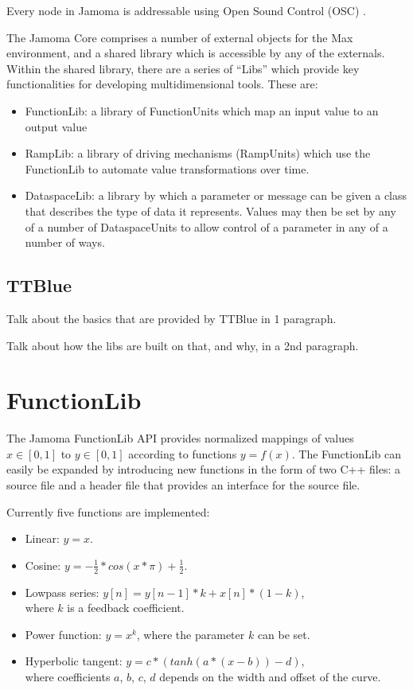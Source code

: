 \documentclass{article}
\begin{document}
Every node in Jamoma is addressable using Open Sound Control (OSC) \cite{Wright:1997}\cite{Wright:2003}. 

The Jamoma Core comprises a number of external objects for the Max \cite{?} environment, and a shared library which is accessible by any of the externals.  Within the shared library, there are a series of ``Libs'' which provide key functionalities for developing multidimensional tools.  These are:
\begin{itemize}
	\item FunctionLib: a library of FunctionUnits which map an input value to an output value
	\item RampLib: a library of driving mechanisms (RampUnits) which use the FunctionLib to automate value transformations over time.
	\item DataspaceLib: a library by which a parameter or message can be given a class that describes the type of data it represents.  Values may then be set by any of a number of DataspaceUnits to allow control of a parameter in any of a number of ways.
\end{itemize}



\subsection{TTBlue}

Talk about the basics that are provided by TTBlue in 1 paragraph.

Talk about how the libs are built on that, and why, in a 2nd paragraph.




\section{FunctionLib}\label{sec:functionlib}

The Jamoma FunctionLib API provides normalized mappings of values $x \in [0,1]$ to $y \in [0,1]$ according to functions $y = f(x)$. The FunctionLib can easily be expanded by introducing new functions in the form of two C++ files: a source file and a header file that provides an interface for the source file.

Currently five functions are implemented: 

\begin{itemize}
	\item Linear: $y = x$.
	\item Cosine: $y = - \frac{1}{2} * cos(x * \pi ) + \frac{1}{2} $.
	\item Lowpass series: $y[n] = y[n-1] * k + x[n] * (1-k)$, \\ where $k$ is a feedback coefficient.
	\item Power function: $ y = x^{k} $, where the parameter $k$ can be set.
	\item Hyperbolic tangent: $ y = c * (tanh(a*(x-b)) - d) $, \\ where coefficients $a$, $b$, $c$, $d$ depends on the width and offset of the curve.
\end{itemize}
\end{document}
